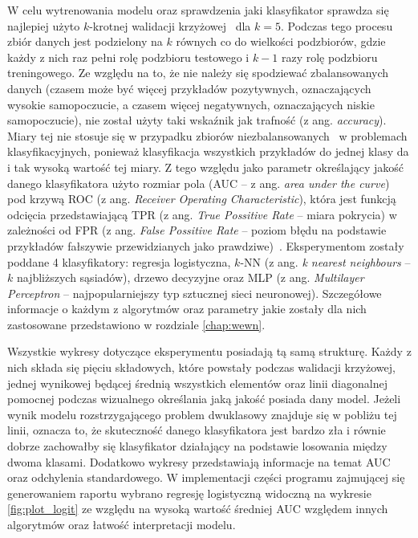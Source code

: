 \documentclass[a4paper,twoside,12pt]{book}
\newcommand{\obcy}[1]{\emph{#1}}
\newcommand{\ang}[1]{{\selectlanguage{british}\obcy{#1}}}
\begin{document}
W celu wytrenowania modelu oraz sprawdzenia jaki klasyfikator sprawdza się najlepiej użyto $k$-krotnej walidacji krzyżowej~\cite{crossvalid} dla $k=5$. Podczas tego procesu zbiór danych jest podzielony na $k$ równych co do wielkości podzbiorów, gdzie każdy z nich raz pełni rolę podzbioru testowego i $k-1$ razy rolę podzbioru treningowego. Ze względu na to, że nie należy się spodziewać zbalansowanych danych (czasem może być więcej przykładów pozytywnych, oznaczających wysokie samopoczucie, a czasem więcej negatywnych, oznaczających niskie samopoczucie), nie został użyty taki wskaźnik jak trafność (z ang. \ang{accuracy}). Miary tej nie stosuje się w przypadku zbiorów niezbalansowanych~\cite{aucvsacc} w problemach klasyfikacyjnych, ponieważ klasyfikacja wszystkich przykładów do jednej klasy da i tak wysoką wartość tej miary. Z tego względu jako parametr określający jakość danego klasyfikatora użyto rozmiar pola (AUC -- z ang. \ang{area under the curve}) pod krzywą ROC (z ang. \ang{Receiver Operating Characteristic}), która jest funkcją odcięcia przedstawiającą TPR (z ang. \ang{True Possitive Rate} -- miara pokrycia) w zależności od FPR (z ang. \ang{False Possitive Rate} -- poziom błędu na podstawie przykładów fałszywie przewidzianych jako prawdziwe)~\cite{auc_roc}. Eksperymentom zostały poddane 4 klasyfikatory: regresja logistyczna, $k$-NN (z ang. \ang{k nearest neighbours} -- $k$ najbliższych sąsiadów), drzewo decyzyjne oraz MLP (z ang. \ang{Multilayer Perceptron} -- najpopularniejszy typ sztucznej sieci neuronowej). Szczegółowe informacje o każdym z algorytmów oraz parametry jakie zostały dla nich zastosowane przedstawiono w rozdziale \ref{chap:wewn}.

Wszystkie wykresy dotyczące eksperymentu posiadają tą samą strukturę. Każdy z nich składa się pięciu składowych, które powstały podczas walidacji krzyżowej, jednej wynikowej będącej średnią wszystkich elementów oraz linii diagonalnej pomocnej podczas wizualnego określania jaką jakość posiada dany model. Jeżeli wynik modelu rozstrzygającego problem dwuklasowy znajduje się w pobliżu tej linii, oznacza to, że skuteczność danego klasyfikatora jest bardzo zła i równie dobrze zachowałby się klasyfikator działający na podstawie losowania między dwoma klasami. Dodatkowo wykresy przedstawiają informacje na temat AUC oraz odchylenia standardowego. W implementacji części programu zajmującej się generowaniem raportu wybrano regresję logistyczną widoczną na wykresie \ref{fig:plot_logit} ze względu na wysoką wartość średniej AUC względem innych algorytmów oraz łatwość interpretacji modelu.
\end{document}
